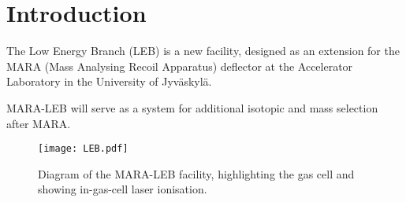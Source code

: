 





\section{Introduction}
The Low Energy Branch (LEB) is a new facility, designed as an extension for the MARA (Mass Analysing Recoil Apparatus) deflector at the Accelerator Laboratory in the University of Jyväskylä.

MARA-LEB will serve as a system for additional isotopic and mass selection after MARA. 

\begin{figure}[H]
    \centering
    \texttt{[image: LEB.pdf]}    
    \caption{Diagram of the MARA-LEB facility, highlighting the gas cell and showing in-gas-cell laser ionisation.}
    \label{fig:LEB_dia}
\end{figure}





